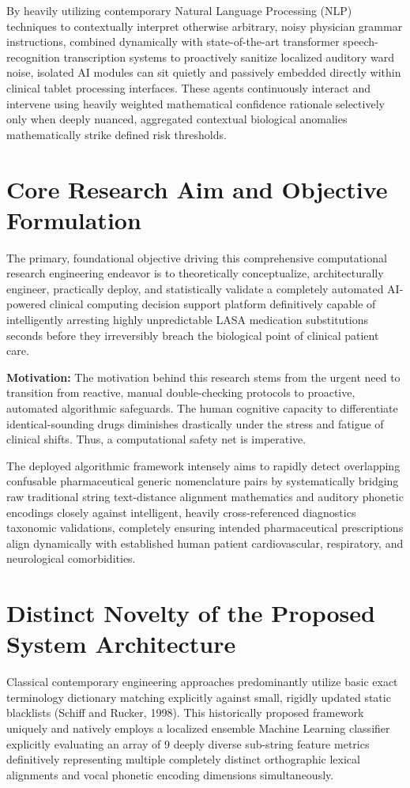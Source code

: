 \documentclass[12pt,a4paper]{report}
\begin{document}
By heavily utilizing contemporary Natural Language Processing (NLP) techniques to contextually interpret otherwise arbitrary, noisy physician grammar instructions, combined dynamically with state-of-the-art transformer speech-recognition transcription systems to proactively sanitize localized auditory ward noise, isolated AI modules can sit quietly and passively embedded directly within clinical tablet processing interfaces. These agents continuously interact and intervene using heavily weighted mathematical confidence rationale selectively only when deeply nuanced, aggregated contextual biological anomalies mathematically strike defined risk thresholds.

\section{Core Research Aim and Objective Formulation}
The primary, foundational objective driving this comprehensive computational research engineering endeavor is to theoretically conceptualize, architecturally engineer, practically deploy, and statistically validate a completely automated AI-powered clinical computing decision support platform definitively capable of intelligently arresting highly unpredictable LASA medication substitutions seconds before they irreversibly breach the biological point of clinical patient care.

\textbf{Motivation:} The motivation behind this research stems from the urgent need to transition from reactive, manual double-checking protocols to proactive, automated algorithmic safeguards. The human cognitive capacity to differentiate identical-sounding drugs diminishes drastically under the stress and fatigue of clinical shifts. Thus, a computational safety net is imperative.

The deployed algorithmic framework intensely aims to rapidly detect overlapping confusable pharmaceutical generic nomenclature pairs by systematically bridging raw traditional string text-distance alignment mathematics and auditory phonetic encodings closely against intelligent, heavily cross-referenced diagnostics taxonomic validations, completely ensuring intended pharmaceutical prescriptions align dynamically with established human patient cardiovascular, respiratory, and neurological comorbidities.

\section{Distinct Novelty of the Proposed System Architecture}
Classical contemporary engineering approaches predominantly utilize basic exact terminology dictionary matching explicitly against small, rigidly updated static blacklists (Schiff and Rucker, 1998). This historically proposed framework uniquely and natively employs a localized ensemble Machine Learning classifier explicitly evaluating an array of 9 deeply diverse sub-string feature metrics definitively representing multiple completely distinct orthographic lexical alignments and vocal phonetic encoding dimensions simultaneously.
\end{document}
